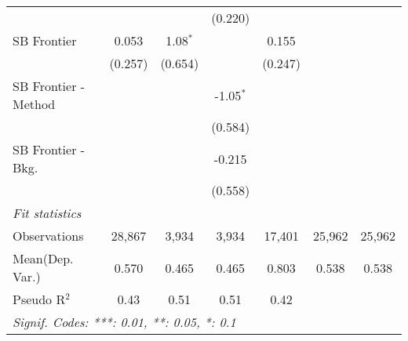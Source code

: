 \begin{tabular}{lcccccc}
                        &               &              & (0.220)       &               &        &   \\   
   SB Frontier          & 0.053         & 1.08$^{*}$   &               & 0.155         &        &   \\   
                        & (0.257)       & (0.654)      &               & (0.247)       &        &   \\   
   SB Frontier - Method &               &              & -1.05$^{*}$   &               &        &   \\   
                        &               &              & (0.584)       &               &        &   \\   
   SB Frontier - Bkg.   &               &              & -0.215        &               &        &   \\   
                        &               &              & (0.558)       &               &        &   \\   
   \midrule
   \emph{Fit statistics}\\
   Observations         & 28,867        & 3,934        & 3,934         & 17,401        & 25,962 & 25,962\\  
Mean(Dep. Var.) & 0.570 & 0.465 & 0.465 & 0.803 & 0.538 & 0.538 \\
   Pseudo R$^2$         & 0.43          & 0.51         & 0.51          & 0.42          &        & \\  
   \midrule \midrule
   \multicolumn{7}{l}{\emph{Signif. Codes: ***: 0.01, **: 0.05, *: 0.1}}\\
\end{tabular}
\par\endgroup
